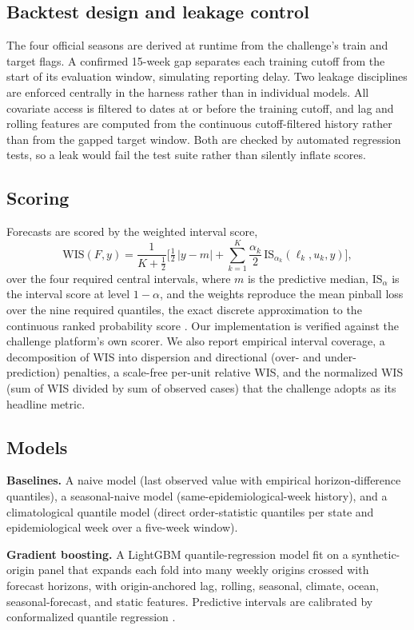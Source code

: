 \documentclass[11pt]{article}
\begin{document}
\subsection{Backtest design and leakage control}
The four official seasons are derived at runtime from the challenge's train and target flags. A
confirmed 15-week gap separates each training cutoff from the start of its evaluation window,
simulating reporting delay. Two leakage disciplines are enforced centrally in the harness rather than
in individual models. All covariate access is filtered to dates at or before the training cutoff, and
lag and rolling features are computed from the continuous cutoff-filtered history rather than from the
gapped target window. Both are checked by automated regression tests, so a leak would fail the test
suite rather than silently inflate scores.

\subsection{Scoring}\label{sec:methods-scoring}
Forecasts are scored by the weighted interval score,
\[
\mathrm{WIS}(F,y)=\frac{1}{K+\tfrac12}\Big[\tfrac12\,|y-m|+\sum_{k=1}^{K}\frac{\alpha_k}{2}\,
\mathrm{IS}_{\alpha_k}(\ell_k,u_k,y)\Big],
\]
over the four required central intervals, where $m$ is the predictive median, $\mathrm{IS}_{\alpha}$
is the interval score at level $1-\alpha$, and the weights reproduce the mean pinball loss over the
nine required quantiles, the exact discrete approximation to the continuous ranked probability score
\citep{gneiting2007,bracher2021}. Our implementation is verified against the challenge platform's own
scorer. We also report empirical interval coverage, a decomposition of WIS into dispersion and
directional (over- and under-prediction) penalties, a scale-free per-unit relative WIS, and the
normalized WIS (sum of WIS divided by sum of observed cases) that the challenge adopts as its headline
metric.

\subsection{Models}
\textbf{Baselines.} A naive model (last observed value with empirical horizon-difference quantiles), a
seasonal-naive model (same-epidemiological-week history), and a climatological quantile model (direct
order-statistic quantiles per state and epidemiological week over a five-week window).

\noindent\textbf{Gradient boosting.} A LightGBM quantile-regression model \citep{ke2017} fit on a
synthetic-origin panel that expands each fold into many weekly origins crossed with forecast horizons,
with origin-anchored lag, rolling, seasonal, climate, ocean, seasonal-forecast, and static features.
Predictive intervals are calibrated by conformalized quantile regression \citep{romano2019}.
\end{document}
